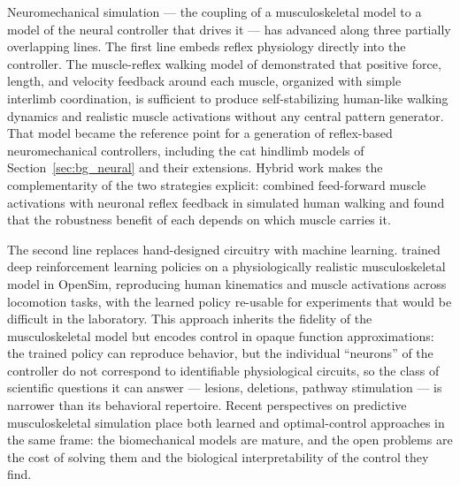 Neuromechanical simulation --- the coupling of a musculoskeletal model to a model of the neural controller that drives it --- has advanced along three partially overlapping lines. The first line embeds reflex physiology directly into the controller. The muscle-reflex walking model of \citet{geyer_musclereflex_2010} demonstrated that positive force, length, and velocity feedback around each muscle, organized with simple interlimb coordination, is sufficient to produce self-stabilizing human-like walking dynamics and realistic muscle activations without any central pattern generator. That model became the reference point for a generation of reflex-based neuromechanical controllers, including the cat hindlimb models of Section~\ref{sec:bg_neural} \citep{markin_afferent_2010, shevtsova_modeling_2016} and their extensions. Hybrid work makes the complementarity of the two strategies explicit: \citet{haeufle_benefit_2018} combined feed-forward muscle activations with neuronal reflex feedback in simulated human walking and found that the robustness benefit of each depends on which muscle carries it.

The second line replaces hand-designed circuitry with machine learning. \citet{song_deep_2021} trained deep reinforcement learning policies on a physiologically realistic musculoskeletal model in OpenSim, reproducing human kinematics and muscle activations across locomotion tasks, with the learned policy re-usable for experiments that would be difficult in the laboratory. This approach inherits the fidelity of the musculoskeletal model but encodes control in opaque function approximations: the trained policy can reproduce behavior, but the individual ``neurons'' of the controller do not correspond to identifiable physiological circuits, so the class of scientific questions it can answer --- lesions, deletions, pathway stimulation --- is narrower than its behavioral repertoire. Recent perspectives on predictive musculoskeletal simulation \citep{degroote_perspective_2021} place both learned and optimal-control approaches in the same frame: the biomechanical models are mature, and the open problems are the cost of solving them and the biological interpretability of the control they find.

